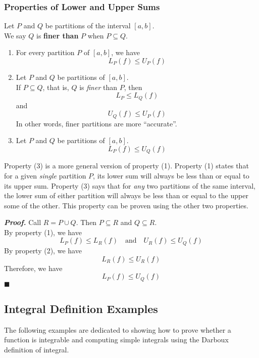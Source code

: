 \documentclass[10pt]{article}
\newenvironment{definition}[1][]{\begin{tcolorbox}[colframe=_orange,colback=_orange2,title=Definition. \ifthenelse{\isempty{#1}}{}{(#1)}
]}{\end{tcolorbox}}
\newcommand{\emptyline}[0]{\\\hfill$~$\\}
\newenvironment{proof}{\par\textit{\textbf{Proof.}}}{\hfill$\blacksquare$}
\begin{document}
\subsubsection{Properties of Lower and Upper Sums}
\begin{definition}[Fine Partitions]
    Let $P$ and $Q$ be partitions of the interval $[a,b]$. \\
    We say $Q$ is \textbf{finer than} $P$ when $P\subseteq Q$.
\end{definition}
\begin{enumerate}
    \item For every partition $P$ of $[a,b]$, we have
          $$
              L_P(f)\leq U_P(f)
          $$
    \item Let $P$ and $Q$ be partitions of $[a,b]$. \\
          If $P\subseteq Q$, that is, $Q$ is \textit{finer} than $P$, then
          $$
              L_P\leq L_Q(f)
          $$
          and
          $$
              U_Q(f)\leq U_P(f)
          $$
          In other words, finer partitions are more ``accurate''.
    \item Let $P$ and $Q$ be partitions of $[a,b]$.
          $$
              L_P(f)\leq U_Q(f)
          $$
\end{enumerate}
Property (3) is a more general version of property (1). Property (1) states that for a given \textit{single} partition $P$, its lower sum will always be less than or equal to its upper sum. Property (3) says that for \textit{any} two partitions of the same interval, the lower sum of either partition will always be less than or equal to the upper some of the other. This property can be proven using the other two properties. \emptyline
\begin{proof}
    Call $R=P\cup Q$. Then $P\subseteq R$ and $Q\subseteq R$. \\
    By property (1), we have
    $$
        L_P(f)\leq L_R(f)\quad\text{and}\quad U_R(f)\leq U_Q(f)
    $$
    By property (2), we have
    $$
        L_R(f)\leq U_R(f)
    $$
    Therefore, we have
    $$
        L_P(f) \leq U_Q(f)
    $$
\end{proof}
\subsection{Integral Definition Examples}
The following examples are dedicated to showing how to prove whether a function is integrable and computing simple integrals using the Darboux definition of integral.
\end{document}
